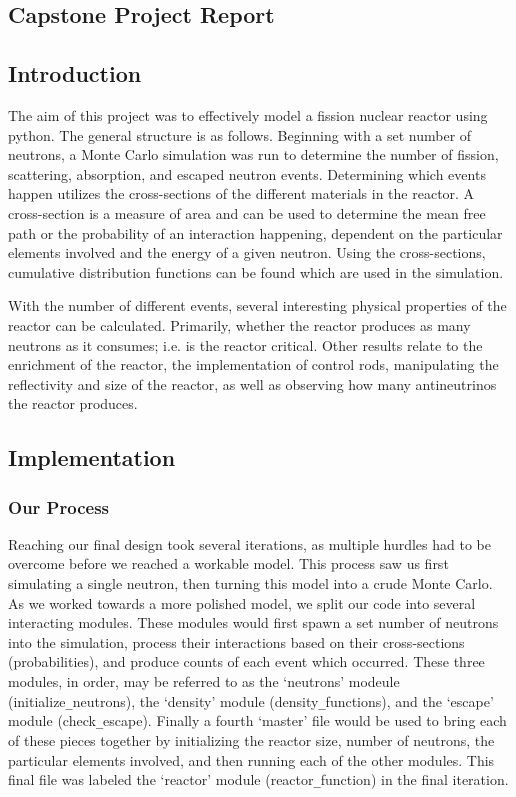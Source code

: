 \documentclass{notes}
\begin{document}
\subsection*{Capstone Project Report}

\subsection*{Introduction}

The aim of this project was to effectively model a fission nuclear reactor using python. The general structure is as follows. Beginning with a set number of neutrons, a Monte Carlo simulation was run to determine the number of fission, scattering, absorption, and escaped neutron events. Determining which events happen utilizes the cross-sections of the different materials in the reactor. A cross-section is a measure of area and can be used to determine the mean free path or the probability of an interaction happening, dependent on the particular elements involved and the energy of a given neutron. Using the cross-sections, cumulative distribution functions can be found which are used in the simulation. 

With the number of different events, several interesting physical properties of the reactor can be calculated. Primarily, whether the reactor produces as many neutrons as it consumes; i.e. is the reactor critical. Other results relate to the enrichment of the reactor, the implementation of control rods, manipulating the reflectivity and size of the reactor, as well as observing how many antineutrinos the reactor produces.

\subsection*{Implementation}

\subsubsection*{Our Process}

Reaching our final design took several iterations, as multiple hurdles had to be overcome before we reached a workable model. This process saw us first simulating a single neutron, then turning this model into a crude Monte Carlo. As we worked towards a more polished model, we split our code into several interacting modules. These modules would first spawn a set number of neutrons into the simulation, process their interactions based on their cross-sections (probabilities), and produce counts of each event which occurred. These three modules, in order, may be referred to as the `neutrons' modeule (initialize\verb|_|neutrons), the `density' module (density\verb|_|functions), and the `escape' module (check\verb|_|escape). Finally a fourth `master' file would be used to bring each of these pieces together by initializing the reactor size, number of neutrons, the particular elements involved, and then running each of the other modules. This final file was labeled the `reactor' module (reactor\verb|_|function) in the final iteration.
\end{document}
